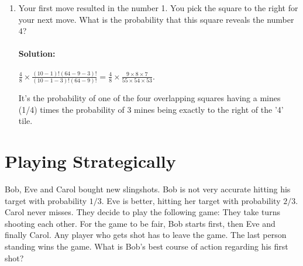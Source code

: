 \documentclass[11pt, notitlepage]{article}
\newcommand{\Question}[1]{\newpage\section{#1}}
\newenvironment{solution}{\paragraph{Solution:}}{\hfill}
\begin{document}
\begin{enumerate}[label=(\alph*)]
\begin{solution}
	P(pick mine outside) = $\frac{10-k}{64-9}$
	
	P(pick mine outside) is smaller for $k>1$.
		
	\end{solution}
	\newpage
	\item Your first move resulted in the number 1. You pick the square to the right for your next move. What is the probability that this square reveals the number $4$?
	\begin{solution} $\frac{4}{8}\times \frac{(10-1)! (64-9-3)!}{(10-1-3)!(64-9)!}=\frac{4}{8}\times \frac{9\times 8\times 7}{55\times 54\times 53}$.
	
	It's the probability of one of the four overlapping squares having a mines (1/4) times the probability of 3 mines being exactly to the right of the '4' tile.
		
	\end{solution}
\end{enumerate}



 

\Question{Playing Strategically}

Bob, Eve and Carol bought new slingshots.  Bob is not very accurate hitting his target with probability $1/3$.  Eve is better, hitting her target with probability $2/3$. Carol never misses. They decide to play the following game:
They take turns shooting each other. For the game to be fair, Bob starts first, then Eve and finally Carol.  Any player who gets shot has to leave the game. The last person standing wins the game. What is Bob's best course of action regarding his first shot?
\end{document}
